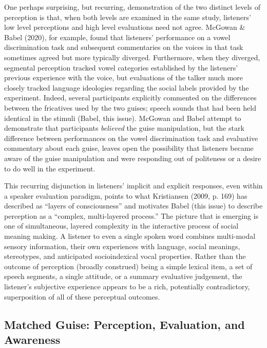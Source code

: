 \documentclass[
  letterpaper,
  DIV=11,
  numbers=noendperiod]{scrartcl}
\begin{document}
One perhaps surprising, but recurring, demonstration of the two distinct
levels of perception is that, when both levels are examined in the same
study, listeners' low level perceptions and high level evaluations need
not agree. McGowan \& Babel (2020), for example, found that listeners'
performance on a vowel discrimination task and subsequent commentaries
on the voices in that task sometimes agreed but more typically diverged.
Furthermore, when they diverged, segmental perception tracked vowel
categories established by the listeners' previous experience with the
voice, but evaluations of the talker much more closely tracked language
ideologies regarding the social labels provided by the experiment.
Indeed, several participants explicitly commented on the differences
between the fricatives used by the two guises; speech sounds that had
been held identical in the stimuli (Babel, this issue). McGowan and
Babel attempt to demonstrate that participants \emph{believed} the guise
manipulation, but the stark difference between performances on the vowel
discrimination task and evaluative commentary about each guise, leaves
open the possibility that listeners became aware of the guise
manipulation and were responding out of politeness or a desire to do
well in the experiment.

This recurring disjunction in listeners' implicit and explicit
responses, even within a speaker evaluation paradigm, points to what
Kristiansen (2009, p. 169) has described as ``layers of consciousness''
and motivates Babel (this issue) to describe perception as a ``complex,
multi-layered process.'' The picture that is emerging is one of
simultaneous, layered complexity in the interactive process of social
meaning making. A listener to even a single spoken word combines
multi-modal sensory information, their own experiences with language,
social meanings, stereotypes, and anticipated socioindexical vocal
properties. Rather than the outcome of perception (broadly construed)
being a simple lexical item, a set of speech segments, a single
attitude, or a summary evaluative judgement, the listener's subjective
experience appears to be a rich, potentially contradictory,
superposition of all of these perceptual outcomes.

\subsection{Matched Guise: Perception, Evaluation, and
Awareness}\label{sec-mgt}
\end{document}
